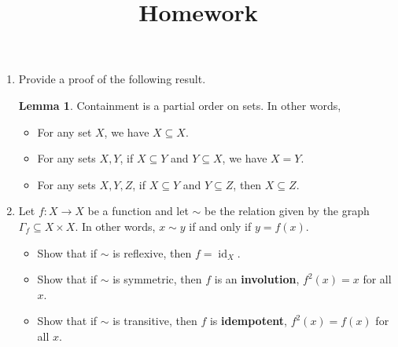 \documentclass[12pt]{amsart}
\theoremstyle{definition}
\newtheorem*{lemma*}{Lemma}
\begin{document}
\title{Homework}

\maketitle

\begin{enumerate}
	\item Provide a proof of the following result. 

	\begin{lemma*}
		Containment is a partial order on sets. In other words, 
		\begin{itemize}
			\item For any set $X$, we have $X \subseteq X$. 
			\item For any sets $X, Y$, if $X \subseteq Y$ and 
				$Y \subseteq X$, we have $X = Y$. 
			\item For any sets $X, Y, Z$, if $X \subseteq Y$ 
				and $Y \subseteq Z$, then $X \subseteq Z$.
		\end{itemize}
	\end{lemma*}
	
	\item Let $f : X \to X$ be a function and let $\sim$ be the relation 
	given by the graph $\Gamma_f \subseteq X \times X$. In other 
	words, $x \sim y$ if and only if $y = f(x)$. 
	\begin{itemize}
		\item Show that if $\sim$ is reflexive, then $f = \operatorname{id}_X$. 
		\item Show that if $\sim$ is symmetric, then $f$ is an 
			\textbf{involution}, $f^2(x) = x$ for all $x$. 
		\item Show that if $\sim$ is transitive, then $f$ is \textbf{idempotent}, 
			$f^2(x) = f(x)$ for all $x$.
	\end{itemize}
		


		
\end{enumerate}
\end{document}
